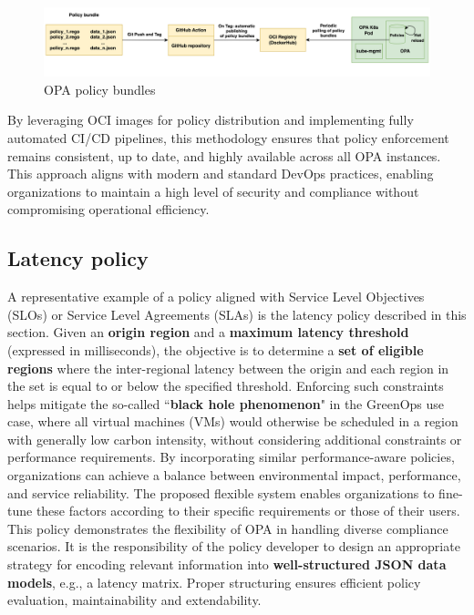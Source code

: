 \begin{figure}[H]
\centering
\includegraphics[width=1\linewidth]{images/opa_bundles.png}
\caption{OPA policy bundles}
\label{fig:opa_bundles}
\end{figure}

By leveraging OCI images for policy distribution and implementing fully automated CI/CD pipelines, this methodology ensures that policy enforcement remains consistent, up to date, and highly available across all OPA instances. 
This approach aligns with modern and standard DevOps practices, enabling organizations to maintain a high level of security and compliance without compromising operational efficiency.

\subsection{Latency policy}

A representative example of a policy aligned with Service Level Objectives (SLOs) or Service Level Agreements (SLAs) is the latency policy described in this section.
Given an \textbf{origin region} and a \textbf{maximum latency threshold} (expressed in milliseconds), the objective is to determine a \textbf{set of eligible regions} where the inter-regional latency between the origin and each region in the set is equal to or below the specified threshold.
Enforcing such constraints helps mitigate the so-called ``\textbf{black hole phenomenon}" in the GreenOps use case, where all virtual machines (VMs) would otherwise be scheduled in a region with generally low carbon intensity, without considering additional constraints or performance requirements. By incorporating similar performance-aware policies, organizations can achieve a balance between environmental impact, performance, and service reliability.
The proposed flexible system enables organizations to fine-tune these factors according to their specific requirements or those of their users. 
This policy demonstrates the flexibility of OPA in handling diverse compliance scenarios. It is the responsibility of the policy developer to design an appropriate strategy for encoding relevant information into \textbf{well-structured JSON data models}, e.g., a latency matrix. Proper structuring ensures efficient policy evaluation, maintainability and extendability.

